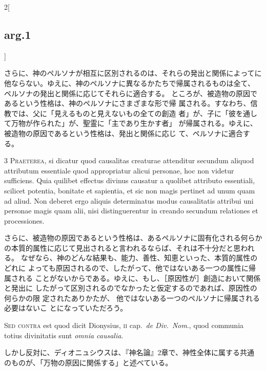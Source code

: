 \documentclass[paper=a4paper,fontsize=10pt,jafontsize=9pt,titlepage]{jlreq}
\begin{document}
\begin{paracol}{2}[\subsection{arg.1}]
\switchcolumn

さらに、神のペルソナが相互に区別されるのは、それらの発出と関係によってに
 他ならない。ゆえに、神のペルソナに異なるかたちで帰属されるものは全て、
 ペルソナの発出と関係に応じてそれらに適合する。
ところが、被造物の原因であるという性格は、神のペルソナにさまざまな形で帰
 属される。すなわち、信教では、父に「見えるものと見えないもの全ての創造
 者」が、子に「彼を通して万物が作られた」が、聖霊に「主であり生かす者」
 が帰属される。ゆえに、被造物の原因であるという性格は、発出と関係に応じ
 て、ペルソナに適合する。


{\scshape 3 Praeterea}, si dicatur quod causalitas
creaturae attenditur secundum aliquod attributum essentiale quod
appropriatur alicui personae, hoc non videtur sufficiens. Quia quilibet
effectus divinus causatur a quolibet attributo essentiali, scilicet
potentia, bonitate et sapientia, et sic non magis pertinet ad unum quam
ad aliud. Non deberet ergo aliquis determinatus modus causalitatis
attribui uni personae magis quam alii, nisi distinguerentur in creando
secundum relationes et processiones.

\switchcolumn

さらに、被造物の原因であるという性格は、あるペルソナに固有化される何らか
の本質的属性に応じて見出されると言われるならば、それは不十分だと思われる。
なぜなら、神のどんな結果も、能力、善性、知恵といった、本質的属性のどれに
よっても原因されるので、したがって、他ではないある一つの属性に帰属される
ことがないからである。ゆえに、もし、［原因性が］創造において関係と発出に
したがって区別されるのでなかったと仮定するのであれば、原因性の何らかの限
定されたありかたが、 他ではないある一つのペルソナに帰属される必要はないこ
とになっていただろう。

\switchcolumn*[\subsection{s.c.}]

{\scshape Sed contra} est quod dicit Dionysius, {\scshape ii}
cap.~{\itshape de Div.~Nom}., quod communia totius divinitatis sunt
{\itshape omnia causalia}.

\switchcolumn

しかし反対に、ディオニュシウスは、『神名論』2章で、神性全体に属する共通
 のものが、「万物の原因に関係する」と述べている。


\end{paracol}
\end{document}
